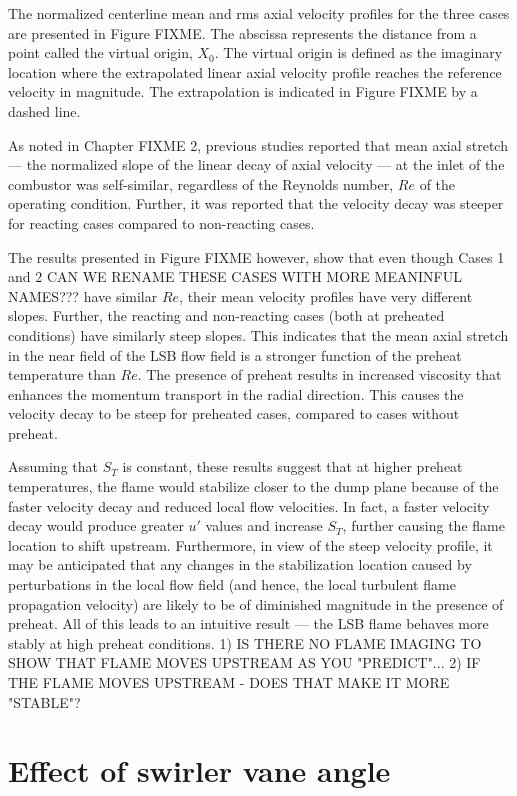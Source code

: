 The normalized centerline mean and rms axial velocity profiles for the three cases are presented in Figure FIXME.
The abscissa represents the distance from a point called the virtual origin, \(X_0\).
The virtual origin is defined as the imaginary location where the extrapolated linear axial velocity profile reaches the reference velocity in magnitude.
The extrapolation is indicated in Figure FIXME by a dashed line.

As noted in Chapter FIXME 2, previous studies\cite{2008-cheng-a} reported that mean axial stretch --- the normalized slope of the linear decay of axial velocity --- at the inlet of the combustor was self-similar, regardless of the Reynolds number, \(Re\) of the operating condition.
Further, it was reported that the velocity decay was steeper for reacting cases compared to non-reacting cases.

The results presented in Figure FIXME however, show that even though Cases 1 and 2 CAN WE RENAME THESE CASES WITH MORE MEANINFUL NAMES??? have similar \(Re\), their mean velocity profiles have very different slopes.
Further, the reacting and non-reacting cases (both at preheated conditions) have similarly steep slopes.
This indicates that the mean axial stretch in the near field of the LSB flow field is a stronger function of the preheat temperature than \(Re\).
The presence of preheat results in increased viscosity that enhances the momentum transport in the radial direction.
This causes the velocity decay to be steep for preheated cases, compared to cases without preheat.

Assuming that \(S_T\) is constant, these results suggest that at higher preheat temperatures, the flame would stabilize closer to the dump plane because of the faster velocity decay and reduced local flow velocities.
In fact, a faster velocity decay would produce greater \(u'\) values and increase \(S_T\), further causing the flame location to shift upstream.
Furthermore, in view of the steep velocity profile, it may be anticipated that any changes in the stabilization location caused by perturbations in the local flow field (and hence, the local turbulent flame propagation velocity) are likely to be of diminished magnitude in the presence of preheat.
All of this leads to an intuitive result --- the LSB flame behaves more stably at high preheat conditions.
1) IS THERE NO FLAME IMAGING TO SHOW THAT FLAME MOVES UPSTREAM AS YOU "PREDICT"...
2) IF THE FLAME MOVES UPSTREAM - DOES THAT MAKE IT MORE "STABLE"?

\section{Effect of swirler vane angle}
\label{sec:vaneAngleEffect}


